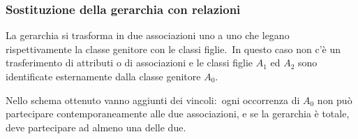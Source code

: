 \subsubsection{Sostituzione della gerarchia con relazioni}
La gerarchia si trasforma in due associazioni uno a uno che legano rispettivamente la classe genitore con le classi figlie.\
In questo caso non c'è un trasferimento di attributi o di associazioni e le classi figlie $A_{1}$ ed $A_{2}$ sono identificate esternamente dalla classe genitore $A_{0}$.

Nello schema ottenuto vanno aggiunti dei vincoli:\ ogni occorrenza di $A_{0}$ non può partecipare contemporaneamente alle due associazioni, e se la gerarchia è totale, deve partecipare ad almeno una delle due.\

